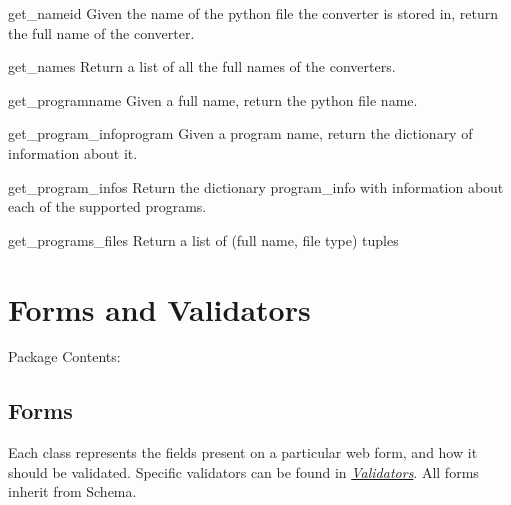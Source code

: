 \documentclass[letterpaper,10pt,english]{manual}
\begin{document}
\hypertarget{webscavator.converters.get_name}{}\begin{funcdesc}{get\_name}{id}
Given the name of the python file the converter is stored in, 
return the full name of the converter.
\end{funcdesc}

\hypertarget{webscavator.converters.get_names}{}\begin{funcdesc}{get\_names}{}
Return a list of all the full names of the converters.
\end{funcdesc}

\hypertarget{webscavator.converters.get_program}{}\begin{funcdesc}{get\_program}{name}
Given a full name, return the python file name.
\end{funcdesc}

\hypertarget{webscavator.converters.get_program_info}{}\begin{funcdesc}{get\_program\_info}{program}
Given a program name, return the dictionary of information about it.
\end{funcdesc}

\hypertarget{webscavator.converters.get_program_infos}{}\begin{funcdesc}{get\_program\_infos}{}
Return the dictionary program\_info with information about each of the supported programs.
\end{funcdesc}

\hypertarget{webscavator.converters.get_programs_files}{}\begin{funcdesc}{get\_programs\_files}{}
Return a list of (full name, file type) tuples
\end{funcdesc}

\resetcurrentobjects
\hypertarget{--doc-inputs}{}

\section{Forms and Validators}

Package Contents:

\resetcurrentobjects
\hypertarget{--doc-forms}{}

\subsection{Forms}
\hypertarget{module-webscavator.forms.forms}{}
\modulesynopsis{}
Each class represents the fields present on a particular web form, and how it should be validated.
Specific validators can be found in \hyperlink{--doc-validators}{\emph{Validators}}. All forms inherit from Schema.
\end{document}
